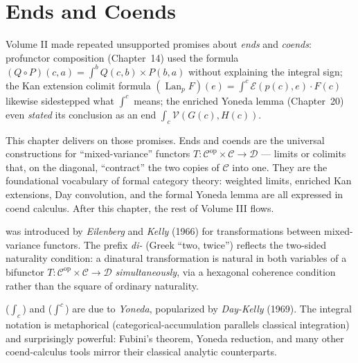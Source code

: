 
\chapter{Ends and Coends}

\begin{overviewbox}
Volume II made repeated unsupported promises about \emph{ends} and
\emph{coends}: profunctor composition (Chapter~14) used the formula
$(Q \circ P)(c,a) = \int^b Q(c,b) \times P(b,a)$ without explaining the
integral sign; the Kan extension colimit formula
$(\operatorname{Lan}_p F)(e) = \int^c \mathcal{E}(p(c), e) \cdot F(c)$ likewise
sidestepped what $\int^c$ means; the enriched Yoneda lemma (Chapter~20)
even \emph{stated} its conclusion as an end $\int_c \mathcal{V}(G(c), H(c))$.

This chapter delivers on those promises. Ends and coends are the universal
constructions for ``mixed-variance'' functors $T : \mathcal{C}^{\mathrm{op}}
\times \mathcal{C} \to \mathcal{D}$ — limits or colimits that, on the diagonal,
``contract'' the two copies of $\mathcal{C}$ into one. They are the
foundational vocabulary of formal category theory: weighted limits, enriched
Kan extensions, Day convolution, and the formal Yoneda lemma are all
expressed in coend calculus. After this chapter, the rest of Volume III
flows.
\end{overviewbox}


\begin{nameorigin}
 was introduced by \emph{Eilenberg} and
\emph{Kelly} (1966) for transformations between mixed-variance functors.
The prefix \emph{di-} (Greek ``two, twice'') reflects the two-sided
naturality condition: a dinatural transformation is natural in both
variables of a bifunctor $T : \mathcal{C}^{\mathrm{op}} \times \mathcal{C}
\to \mathcal{D}$ \emph{simultaneously}, via a hexagonal coherence
condition rather than the square of ordinary naturality.

 ($\int_c$) and  ($\int^c$) are due to
\emph{Yoneda}, popularized by \emph{Day-Kelly} (1969). The integral
notation is metaphorical (categorical-accumulation parallels classical
integration) and surprisingly powerful: Fubini's theorem, Yoneda
reduction, and many other coend-calculus tools mirror their classical
analytic counterparts.
\end{nameorigin}

